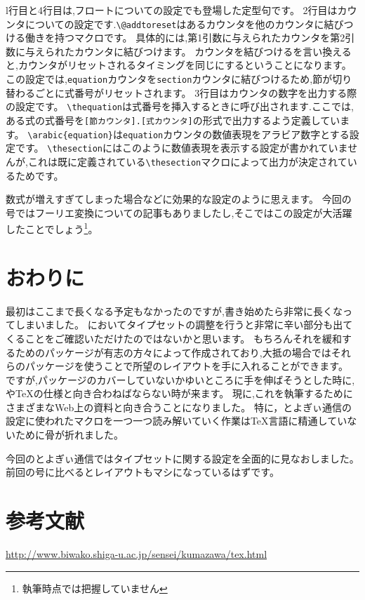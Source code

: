 l行目と4行目は,フロートについての設定でも登場した定型句です。
2行目はカウンタについての設定です.\verb|\@addtoreset|はあるカウンタを他のカウンタに結びつける働きを持つマクロです。
具体的には,第1引数に与えられたカウンタを第2引数に与えられたカウンタに結びつけます。
カウンタを結びつけるを言い換えると,カウンタがリセットされるタイミングを同じにするということになります。
この設定では,\verb|equation|カウンタを\verb|section|カウンタに結びつけるため,節が切り替わるごとに式番号がリセットされます。
3行目はカウンタの数字を出力する際の設定です。
\verb|\thequation|は式番号を挿入するときに呼び出されます.ここでは,ある式の式番号を\verb|[節カウンタ].[式カウンタ]|の形式で出力するよう定義しています。
\verb|\arabic{equation}|は\verb|equation|カウンタの数値表現をアラビア数字とする設定です。
\verb|\thesection|にはこのように数値表現を表示する設定が書かれていませんが,これは既に定義されている\verb|\thesection|マクロによって出力が決定されているためです。

数式が増えすぎてしまった場合などに効果的な設定のように思えます。
今回の号ではフーリエ変換についての記事もありましたし,そこではこの設定が大活躍したことでしょう\footnote{執筆時点では把握していません}。

\section{おわりに}

最初はここまで長くなる予定もなかったのですが,書き始めたら非常に長くなってしまいました。
{\pLaTeX}においてタイプセットの調整を行うと非常に辛い部分も出てくることをご確認いただけたのではないかと思います。
もちろんそれを緩和するためのパッケージが有志の方々によって作成されており,大抵の場合ではそれらのパッケージを使うことで所望のレイアウトを手に入れることができます。
ですが,パッケージのカバーしていないかゆいところに手を伸ばそうとした時に,{\pLaTeX}や{\TeX}の仕様と向き合わねばならない時が来ます。
現に,これを執筆するためにさまざまなWeb上の資料と向き合うことになりました。
特に，とよぎぃ通信の設定に使われたマクロを一つ一つ読み解いていく作業は{\TeX}言語に精通していないために骨が折れました。

今回のとよぎぃ通信ではタイプセットに関する設定を全面的に見なおしました。
前回の号に比べるとレイアウトもマシになっているはずです。

\section*{参考文献}
\url{http://www.biwako.shiga-u.ac.jp/sensei/kumazawa/tex.html}
